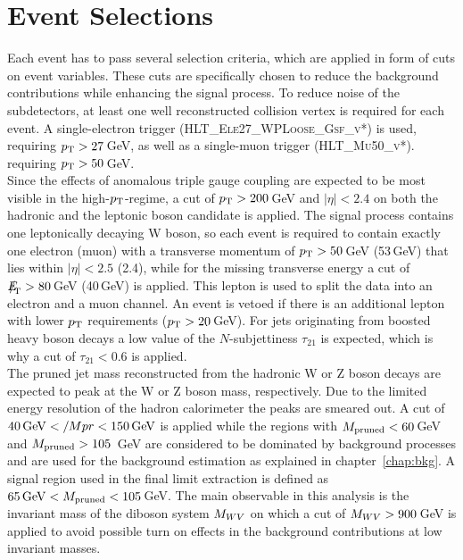 \section{Event Selections}
\label{sec:eventselection}
Each event has to pass several selection criteria, which are applied in form of cuts on event variables. These cuts are specifically chosen to reduce the background contributions while enhancing the signal process. To reduce noise of the subdetectors, at least one well reconstructed collision vertex is required for each event. A single-electron trigger (\textsc{HLT\_}\textsc{Ele27\_}\textsc{WPLoose\_}\textsc{Gsf\_}\textsc{v*}) is used, requiring $p_{\rm T}>27$\,GeV, as well as a single-muon trigger (\textsc{HLT\_}\textsc{Mu50\_}\textsc{v*}). requiring $p_{\rm T}>50$\,GeV.\\

\noindent Since the effects of anomalous triple gauge coupling are expected to be most visible in the high-$p_{\rm T}$-regime, a cut of $p_{\rm T}>200$\,GeV and $|\eta|<2.4$ on both the hadronic and the leptonic boson candidate is applied. The signal process contains one leptonically decaying W boson, so each event is required to contain exactly one electron (muon) with a transverse momentum of $p_{\rm T}>50$\,GeV (53\,GeV) that lies within $|\eta|<2.5$ (2.4), while for the missing transverse energy a cut of ${E\!\!\!\!/}_{\!\mathrm{T}} >80$\,GeV (40\,GeV) is applied. This lepton is used to split the data into an electron and a muon channel. An event is vetoed if there is an additional lepton with lower $p_{\rm T}$ requirements ($p_{\rm T}>20$\,GeV).  For jets originating from boosted heavy boson decays a low value of the $N$-subjettiness $\tau_{21}$ is expected, which is why a cut of $\tau_{21}<0.6$ is applied.\\

\noindent The pruned jet mass reconstructed from the hadronic W or Z boson decays are expected to peak at the W or Z boson mass, respectively. Due to the limited energy resolution of the hadron calorimeter the peaks are smeared out. A cut of $40\,{\rm GeV}</Mpr<150\,{\rm GeV}$ is applied while the regions with $M_\mathrm{pruned}<60$\,GeV and $M_\mathrm{pruned}>105$\, GeV are considered to be dominated by background processes and are used for the background estimation as explained in chapter~\ref{chap:bkg}. A signal region used in the final limit extraction is defined as $65\,{\rm GeV}<M_\mathrm{pruned}<105$\,GeV. The main observable in this analysis is the invariant mass of the diboson system $M_{WV}$ on which a cut of $M_{WV}>900$\,GeV is applied to avoid possible turn on effects in the background contributions at low invariant masses.

